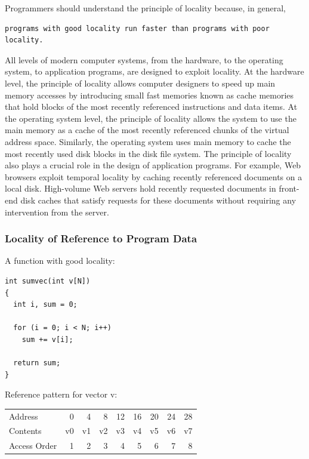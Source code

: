 \documentclass[11pt]{article}
\begin{document}
Programmers should understand the principle of locality because, in general,\\
\begin{verbatim}
programs with good locality run faster than programs with poor locality.
\end{verbatim}


All levels of modern computer systems, from the hardware, to the operating system, to application programs, are designed to exploit locality. At the hardware level, the principle of locality allows computer designers to speed up main memory accesses by introducing small fast memories known as cache memories that hold blocks of the most recently referenced instructions and data items. At the operating system level, the principle of locality allows the system to use the main memory as a cache of the most recently referenced chunks of the virtual address space. Similarly, the operating system uses main memory to cache the most recently used disk blocks in the disk file system. The principle of locality also plays a crucial role in the design of application programs. For example, Web browsers exploit temporal locality by caching recently referenced documents on a local disk. High-volume Web servers hold recently requested documents in front-end disk caches that satisfy requests for these documents without requiring any intervention from the server.\\


\subsubsection{Locality of Reference to Program Data}
\label{sec:org90799c7}
A function with good locality:\\
\begin{verbatim}
int sumvec(int v[N])
{
  int i, sum = 0;

  for (i = 0; i < N; i++)
    sum += v[i];

  return sum;
}
\end{verbatim}


Reference pattern for vector v:\\
\begin{center}
\begin{tabular}{lrrrrrrrr}
Address & 0 & 4 & 8 & 12 & 16 & 20 & 24 & 28\\
Contents & v0 & v1 & v2 & v3 & v4 & v5 & v6 & v7\\
Access Order & 1 & 2 & 3 & 4 & 5 & 6 & 7 & 8\\
\end{tabular}
\end{center}
\end{document}
